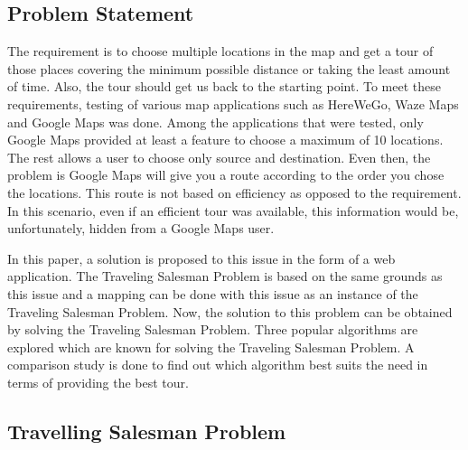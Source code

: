 \documentclass[conference]{IEEEtran}
\begin{document}
\subsection {Problem Statement}

The requirement is to choose multiple locations in the map and get a tour of those places covering the minimum possible distance or taking the least amount of time. Also, the tour should get us back to the starting point. To meet these requirements, testing of various map applications such as HereWeGo, Waze Maps and Google Maps was done. Among the applications that were tested, only Google Maps provided at least a feature to choose a maximum of 10 locations. The rest allows a user to choose only source and destination. Even then, the problem is Google Maps will give you a route according to the order you chose the locations. This route is not based on efficiency as opposed to the requirement. In this scenario, even if an efficient tour was available, this information would be, unfortunately, hidden from a Google Maps user. 

In this paper, a solution is proposed to this issue in the form of a web application. The Traveling Salesman Problem is based on the same grounds as this issue and a mapping can be done with this issue as an instance of the Traveling Salesman Problem. Now, the solution to this problem can be obtained by solving the Traveling Salesman Problem. Three popular algorithms are explored which are known for solving the Traveling Salesman Problem. A comparison study is done to find out which algorithm best suits the need in terms of providing the best tour.


\subsection {Travelling Salesman Problem}
\end{document}
